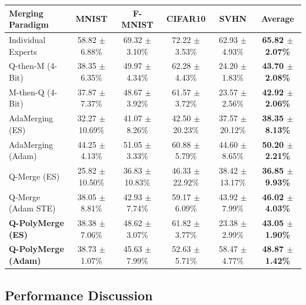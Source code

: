 \begin{table}[t]
\begin{minipage}{0.49\textwidth}
\label{tab:4bit_results}
\vskip 0.1in
\begin{scriptsize}
\begin{sc}
\begin{tabular}{lccccc}
\toprule
Merging Paradigm & MNIST & F-MNIST & CIFAR10 & SVHN & Average \\
\midrule
Individual Experts & 58.82 $\pm$ 6.88\% & 69.32 $\pm$ 3.10\% & 72.22 $\pm$ 3.53\% & 62.93 $\pm$ 4.93\% & \textbf{65.82 $\pm$ 2.07\%} \\
Q-then-M (4-Bit) & 38.35 $\pm$ 6.35\% & 49.97 $\pm$ 4.34\% & 62.28 $\pm$ 4.43\% & 24.20 $\pm$ 1.83\% & \textbf{43.70 $\pm$ 2.08\%} \\
M-then-Q (4-Bit) & 37.87 $\pm$ 7.37\% & 48.67 $\pm$ 3.92\% & 61.57 $\pm$ 3.72\% & 23.57 $\pm$ 2.56\% & \textbf{42.92 $\pm$ 2.06\%} \\
AdaMerging (ES) & 32.27 $\pm$ 10.69\% & 41.07 $\pm$ 8.26\% & 42.50 $\pm$ 20.23\% & 37.57 $\pm$ 20.12\% & \textbf{38.35 $\pm$ 8.13\%} \\
AdaMerging (Adam) & 44.25 $\pm$ 4.13\% & 51.05 $\pm$ 3.33\% & 60.88 $\pm$ 5.79\% & 44.60 $\pm$ 8.65\% & \textbf{50.20 $\pm$ 2.21\%} \\
Q-Merge (ES) & 25.82 $\pm$ 10.50\% & 36.83 $\pm$ 10.83\% & 46.33 $\pm$ 22.92\% & 38.42 $\pm$ 13.17\% & \textbf{36.85 $\pm$ 9.93\%} \\
Q-Merge (Adam STE) & 38.05 $\pm$ 8.81\% & 42.93 $\pm$ 7.74\% & 59.17 $\pm$ 6.09\% & 43.92 $\pm$ 7.99\% & \textbf{46.02 $\pm$ 4.03\%} \\
\midrule
\textbf{Q-PolyMerge (ES)} & 38.38 $\pm$ 7.06\% & 48.62 $\pm$ 3.07\% & 61.82 $\pm$ 3.77\% & 23.38 $\pm$ 2.99\% & \textbf{43.05 $\pm$ 1.90\%} \\
\textbf{Q-PolyMerge (Adam)} & 38.73 $\pm$ 1.07\% & 45.63 $\pm$ 7.99\% & 52.63 $\pm$ 5.71\% & 58.47 $\pm$ 4.77\% & \textbf{48.87 $\pm$ 1.42\%} \\
\bottomrule
\end{tabular}
\end{sc}
\end{scriptsize}
\end{minipage}
\end{table}

\subsection{Performance Discussion}

